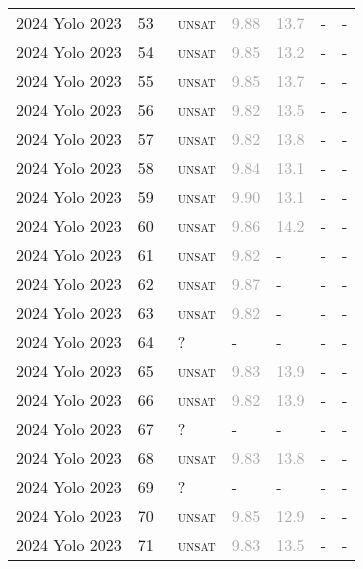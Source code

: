 \begin{center}
{\begin{longtable}{@{}lllllll@{}}
2024 Yolo 2023 & 53 & ~\textsc{unsat} & \textcolor{darkgray}{9.88} & \textcolor{darkgray}{13.7} & - & - \\
2024 Yolo 2023 & 54 & ~\textsc{unsat} & \textcolor{darkgray}{9.85} & \textcolor{darkgray}{13.2} & - & - \\
2024 Yolo 2023 & 55 & ~\textsc{unsat} & \textcolor{darkgray}{9.85} & \textcolor{darkgray}{13.7} & - & - \\
2024 Yolo 2023 & 56 & ~\textsc{unsat} & \textcolor{darkgray}{9.82} & \textcolor{darkgray}{13.5} & - & - \\
2024 Yolo 2023 & 57 & ~\textsc{unsat} & \textcolor{darkgray}{9.82} & \textcolor{darkgray}{13.8} & - & - \\
2024 Yolo 2023 & 58 & ~\textsc{unsat} & \textcolor{darkgray}{9.84} & \textcolor{darkgray}{13.1} & - & - \\
2024 Yolo 2023 & 59 & ~\textsc{unsat} & \textcolor{darkgray}{9.90} & \textcolor{darkgray}{13.1} & - & - \\
2024 Yolo 2023 & 60 & ~\textsc{unsat} & \textcolor{darkgray}{9.86} & \textcolor{darkgray}{14.2} & - & - \\
2024 Yolo 2023 & 61 & ~\textsc{unsat} & \textcolor{darkgray}{9.82} & - & - & - \\
2024 Yolo 2023 & 62 & ~\textsc{unsat} & \textcolor{darkgray}{9.87} & - & - & - \\
2024 Yolo 2023 & 63 & ~\textsc{unsat} & \textcolor{darkgray}{9.82} & - & - & - \\
2024 Yolo 2023 & 64 & ~? & - & - & - & - \\
2024 Yolo 2023 & 65 & ~\textsc{unsat} & \textcolor{darkgray}{9.83} & \textcolor{darkgray}{13.9} & - & - \\
2024 Yolo 2023 & 66 & ~\textsc{unsat} & \textcolor{darkgray}{9.82} & \textcolor{darkgray}{13.9} & - & - \\
2024 Yolo 2023 & 67 & ~? & - & - & - & - \\
2024 Yolo 2023 & 68 & ~\textsc{unsat} & \textcolor{darkgray}{9.83} & \textcolor{darkgray}{13.8} & - & - \\
2024 Yolo 2023 & 69 & ~? & - & - & - & - \\
2024 Yolo 2023 & 70 & ~\textsc{unsat} & \textcolor{darkgray}{9.85} & \textcolor{darkgray}{12.9} & - & - \\
2024 Yolo 2023 & 71 & ~\textsc{unsat} & \textcolor{darkgray}{9.83} & \textcolor{darkgray}{13.5} & - & - \\
\bottomrule
\end{longtable}
}
\end{center}


